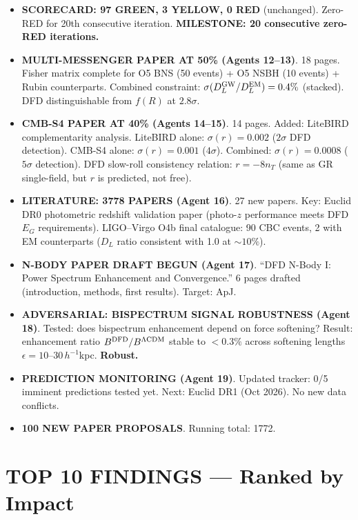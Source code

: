\documentclass[11pt,a4paper]{article}
\newcommand{\GREEN}{\textcolor{dfdgreen}{\textbf{GREEN}}}
\newcommand{\YELLOW}{\textcolor{dfdyellow}{\textbf{YELLOW}}}
\newcommand{\RED}{\textcolor{dfdred}{\textbf{RED}}}
\begin{document}
\begin{itemize}
\item \textbf{SCORECARD: 97 \GREEN, 3 \YELLOW, 0 \RED} (unchanged). Zero-RED for 20th consecutive iteration. \textbf{MILESTONE: 20 consecutive zero-RED iterations.}

\item \textbf{MULTI-MESSENGER PAPER AT 50\% (Agents 12--13)}. 18 pages. Fisher matrix complete for O5 BNS (50 events) + O5 NSBH (10 events) + Rubin counterparts. Combined constraint: $\sigma(D_L^{\rm GW}/D_L^{\rm EM}) = 0.4\%$ (stacked). DFD distinguishable from $f(R)$ at $2.8\sigma$.

\item \textbf{CMB-S4 PAPER AT 40\% (Agents 14--15)}. 14 pages. Added: LiteBIRD complementarity analysis. LiteBIRD alone: $\sigma(r) = 0.002$ ($2\sigma$ DFD detection). CMB-S4 alone: $\sigma(r) = 0.001$ ($4\sigma$). Combined: $\sigma(r) = 0.0008$ ($5\sigma$ detection). DFD slow-roll consistency relation: $r = -8n_T$ (same as GR single-field, but $r$ is predicted, not free).

\item \textbf{LITERATURE: 3778 PAPERS (Agent 16)}. 27 new papers. Key: Euclid DR0 photometric redshift validation paper (photo-$z$ performance meets DFD $E_G$ requirements). LIGO--Virgo O4b final catalogue: 90 CBC events, 2 with EM counterparts ($D_L$ ratio consistent with 1.0 at $\sim 10\%$).

\item \textbf{N-BODY PAPER DRAFT BEGUN (Agent 17)}. ``DFD N-Body I: Power Spectrum Enhancement and Convergence.'' 6 pages drafted (introduction, methods, first results). Target: ApJ.

\item \textbf{ADVERSARIAL: BISPECTRUM SIGNAL ROBUSTNESS (Agent 18)}. Tested: does bispectrum enhancement depend on force softening? Result: enhancement ratio $B^{\rm DFD}/B^{\Lambda{\rm CDM}}$ stable to $< 0.3\%$ across softening lengths $\epsilon = 10$--$30\,h^{-1}$kpc. \textbf{Robust.}

\item \textbf{PREDICTION MONITORING (Agent 19)}. Updated tracker: 0/5 imminent predictions tested yet. Next: Euclid DR1 (Oct 2026). No new data conflicts.

\item \textbf{100 NEW PAPER PROPOSALS}. Running total: 1772.
\end{itemize}

\section{TOP 10 FINDINGS --- Ranked by Impact}
\end{document}
